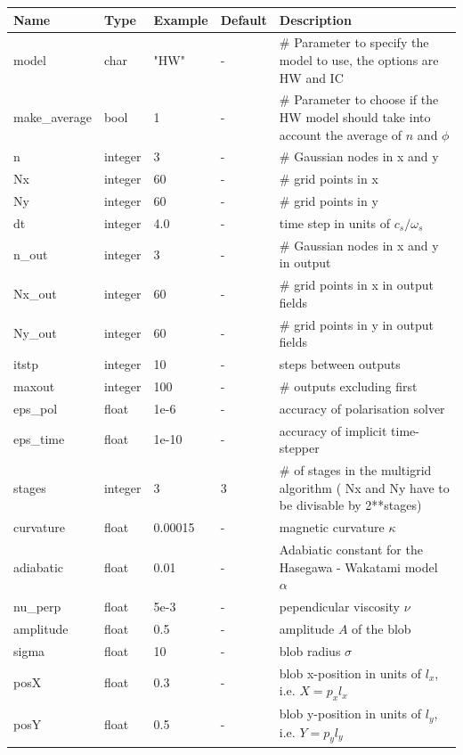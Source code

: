 \documentclass{hitec} %
\begin{document}
\begin{longtable}{llll>{\RaggedRight}p{7cm}}
\toprule
\rowcolor{gray!50}\textbf{Name} &  \textbf{Type} & \textbf{Example} & \textbf{Default} & \textbf{Description}  \\ \midrule
model  & char  & "HW" & - & \# Parameter to specify the model to use, the options are HW and IC \\
make\_average & bool & 1 & - & \# Parameter to choose if the HW model should take into account the average of $n$ and $\phi$ \\
n      & integer & 3 & - &\# Gaussian nodes in x and y \\
Nx     & integer &60& - &\# grid points in x \\
Ny     & integer &60& - &\# grid points in y \\
dt     & integer &4.0& - &time step in units of $c_s/\omega_s$ \\
n\_out  & integer &3  & - &\# Gaussian nodes in x and y in output \\
Nx\_out & integer &60& - &\# grid points in x in output fields \\
Ny\_out & integer &60& - &\# grid points in y in output fields \\
itstp  & integer &10  & - &   steps between outputs \\
maxout & integer &100& - &      \# outputs excluding first \\
eps\_pol   & float &1e-6    & - &  accuracy of polarisation solver \\
eps\_time  & float &1e-10   & - & accuracy of implicit time-stepper \\
stages & integer & 3 & 3 & \# of stages in the  multigrid algorithm ( Nx and Ny have to be divisable by 2**stages) \\
curvature  & float &0.00015& - & magnetic curvature $\kappa$ \\
adiabatic  & float &0.01& - & Adabiatic constant for the Hasegawa - Wakatami model $\alpha$\\
nu\_perp    & float &5e-3   & - & pependicular viscosity $\nu$ \\
amplitude  & float &0.5    & - & amplitude $A$ of the blob \\
sigma      & float &10     & - & blob radius $\sigma$ \\
posX       & float &0.3    & - & blob x-position in units of $l_x$, i.e. $X = p_x l_x$\\
posY       & float &0.5    & - & blob y-position in units of $l_y$, i.e. $Y = p_y l_y$ \\

\end{longtable}
\end{document}
